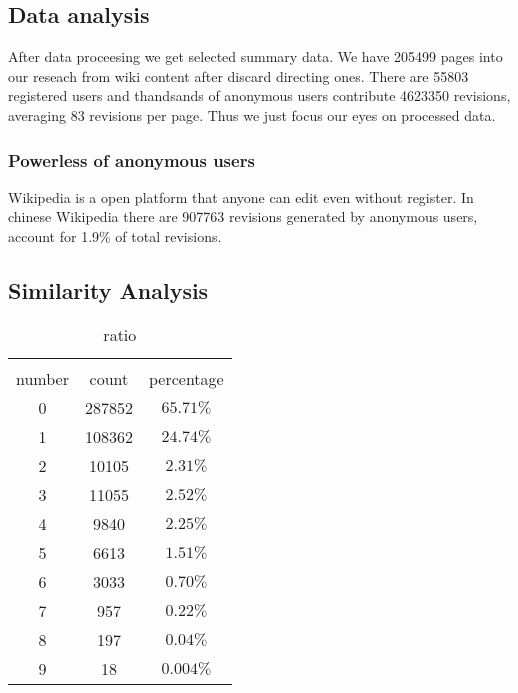 \documentclass{elsarticle}
\begin{document}
\subsection{Data analysis}
\label{sec:data-analysis}

After data proceesing we get selected summary data. We have 205499
pages into our reseach from wiki content after discard directing
ones. There are 55803 registered users and thandsands of anonymous
users contribute 4623350 revisions, averaging  83 revisions per
page. Thus we just focus our eyes on processed data.

\subsubsection{Powerless of anonymous users}
\label{sec:powerl-anonym-users}
Wikipedia is  a open platform that anyone can edit even without
register. In chinese Wikipedia there are 907763  revisions generated
by anonymous users, account for 1.9\% of total revisions.  

\subsection{Similarity Analysis}
\label{sec:similarity-analysis}

\begin{table}
    \centering
    \caption{ratio}
    \begin{tabular}[center]{|c|c|c}
      \hline\\
      number & count & percentage \\\hline
      0 & 287852& $65.71\%$\\\hline
 1 & 108362& $24.74\%$\\\hline
      2 & 10105& $2.31\%$\\\hline
      3 & 11055& $2.52\%$\\\hline
      4 & 9840&$2.25\%$ \\\hline
      5 & 6613& $1.51\%$\\\hline
      6 & 3033& $0.70\%$\\\hline
      7 & 957& $0.22\%$\\\hline
      8 & 197& $0.04\%$\\\hline
      9 & 18& $0.004\%$\\\hline
     
    \end{tabular}
   
 \end{table}
  
\end{document}
